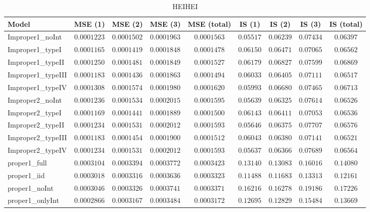 \begin{table}

\caption{\label{tab:model-choice-sc9}HEIHEI}
\centering
\begin{tabular}{lcccccccc}
\hline
Model  & MSE (1) & MSE (2) & MSE (3) & MSE (total) & IS (1) & IS (2) & IS (3) & \multicolumn{1}{c}{IS (total)} \\ 
\hline
Improper1_noInt  & $0.0001223$ & $0.0001502$ & $0.0001963$ & $0.0001563$ & $0.05517$ & $0.06239$ & $0.07434$ & $0.06397$ \\
Improper1_typeI  & $0.0001165$ & $0.0001419$ & $0.0001848$ & $0.0001478$ & $0.06150$ & $0.06471$ & $0.07065$ & $0.06562$ \\
Improper1_typeII  & $0.0001250$ & $0.0001481$ & $0.0001849$ & $0.0001527$ & $0.06179$ & $0.06827$ & $0.07599$ & $0.06869$ \\
Improper1_typeIII  & $0.0001183$ & $0.0001436$ & $0.0001863$ & $0.0001494$ & $0.06033$ & $0.06405$ & $0.07111$ & $0.06517$ \\
Improper1_typeIV  & $0.0001308$ & $0.0001574$ & $0.0001980$ & $0.0001620$ & $0.05993$ & $0.06680$ & $0.07465$ & $0.06713$ \\
Improper2_noInt  & $0.0001236$ & $0.0001534$ & $0.0002015$ & $0.0001595$ & $0.05639$ & $0.06325$ & $0.07614$ & $0.06526$ \\
Improper2_typeI  & $0.0001169$ & $0.0001441$ & $0.0001889$ & $0.0001500$ & $0.06143$ & $0.06411$ & $0.07053$ & $0.06536$ \\
Improper2_typeII  & $0.0001234$ & $0.0001531$ & $0.0002012$ & $0.0001593$ & $0.05646$ & $0.06375$ & $0.07707$ & $0.06576$ \\
Improper2_typeIII  & $0.0001183$ & $0.0001454$ & $0.0001900$ & $0.0001512$ & $0.06043$ & $0.06380$ & $0.07141$ & $0.06521$ \\
Improper2_typeIV  & $0.0001234$ & $0.0001531$ & $0.0002012$ & $0.0001593$ & $0.05637$ & $0.06366$ & $0.07689$ & $0.06564$ \\
proper1_full  & $0.0003104$ & $0.0003394$ & $0.0003772$ & $0.0003423$ & $0.13140$ & $0.13083$ & $0.16016$ & $0.14080$ \\
proper1_iid  & $0.0003018$ & $0.0003316$ & $0.0003636$ & $0.0003323$ & $0.11488$ & $0.11683$ & $0.13313$ & $0.12161$ \\
proper1_noInt  & $0.0003046$ & $0.0003326$ & $0.0003741$ & $0.0003371$ & $0.16216$ & $0.16278$ & $0.19186$ & $0.17226$ \\
proper1_onlyInt  & $0.0002866$ & $0.0003167$ & $0.0003484$ & $0.0003172$ & $0.12695$ & $0.12829$ & $0.15484$ & $0.13669$ \\

\end{tabular}
\end{table}
